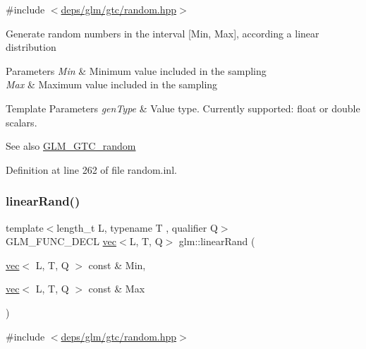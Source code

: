 {\ttfamily \#include $<$\hyperlink{random_8hpp}{deps/glm/gtc/random.\+hpp}$>$}

Generate random numbers in the interval \mbox{[}Min, Max\mbox{]}, according a linear distribution


\begin{DoxyParams}{Parameters}
{\em Min} & Minimum value included in the sampling \\
\hline
{\em Max} & Maximum value included in the sampling \\
\hline
\end{DoxyParams}

\begin{DoxyTemplParams}{Template Parameters}
{\em gen\+Type} & Value type. Currently supported\+: float or double scalars. \\
\hline
\end{DoxyTemplParams}
\begin{DoxySeeAlso}{See also}
\hyperlink{group__gtc__random}{G\+L\+M\+\_\+\+G\+T\+C\+\_\+random} 
\end{DoxySeeAlso}


Definition at line 262 of file random.\+inl.

\mbox{\label{group__gtc__random_ga94731130c298a9ff5e5025fdee6d97a0}} 
\subsubsection{\texorpdfstring{linear\+Rand()}{linearRand()}\hspace{0.1cm}{\footnotesize\ttfamily [2/2]}}
{\footnotesize\ttfamily template$<$length\+\_\+t L, typename T , qualifier Q$>$ \\
G\+L\+M\+\_\+\+F\+U\+N\+C\+\_\+\+D\+E\+CL \hyperlink{structglm_1_1vec}{vec}$<$L, T, Q$>$ glm\+::linear\+Rand (\begin{DoxyParamCaption}\item[{\hyperlink{structglm_1_1vec}{vec}$<$ L, T, Q $>$ const \&}]{Min,  }\item[{\hyperlink{structglm_1_1vec}{vec}$<$ L, T, Q $>$ const \&}]{Max }\end{DoxyParamCaption})}



{\ttfamily \#include $<$\hyperlink{random_8hpp}{deps/glm/gtc/random.\+hpp}$>$}

